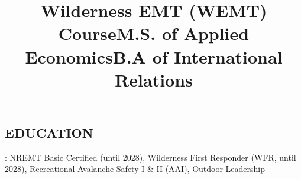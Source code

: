 \documentclass[resmargin, centered, 10pt]{../res}
\begin{document}
\begin{resume}
\fullline

\section{EDUCATION}

: NREMT Basic Certified (until 2028), Wilderness First Responder (WFR, until 2028), Recreational Avalanche Safety I \& II (AAI), Outdoor Leadership

\title{Wilderness EMT (WEMT) Course}
\begin{position}
\end{position}

\title{M.S. of Applied Economics}
\begin{position}
\end{position}

\title{B.A of International Relations}
\begin{position}
\end{position}

\end{resume}
\end{document}
